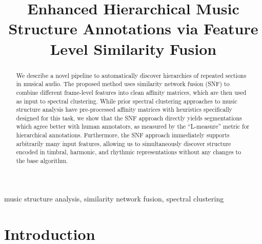 \documentclass{article}
\title{Enhanced Hierarchical Music Structure Annotations via Feature Level Similarity Fusion}
\begin{document}
%
\maketitle
\begin{abstract}


 We describe a novel pipeline to automatically discover hierarchies of repeated sections in musical audio. The proposed method uses similarity network fusion (SNF) to combine different frame-level features into clean affinity matrices, which are then used as input to spectral clustering. While prior spectral clustering approaches to music structure analysis have pre-processed affinity matrices with heuristics specifically designed for this task, we show that the SNF approach directly yields segmentations which agree better with human annotators, as measured by the ``L-measure'' metric for hierarchical annotations. Furthermore, the SNF approach immediately supports arbitrarily many input features, allowing us to simultaneously discover structure encoded in timbral, harmonic, and rhythmic representations without any changes to the base algorithm.

\end{abstract}
%
\begin{keywords}
music structure analysis, similarity network fusion, spectral clustering
\end{keywords}
%
\section{Introduction}\label{sec:intro}
\end{document}
